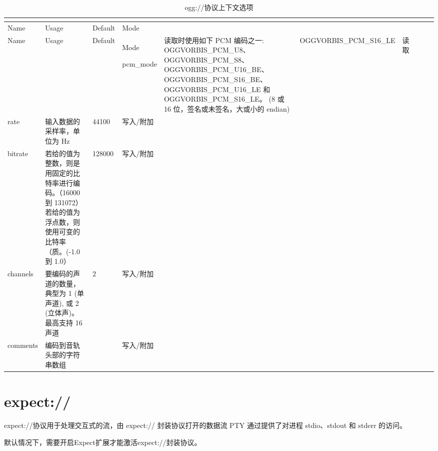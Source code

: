 \begin{longtable}{|m{40pt}|m{150pt}|m{60pt}|m{100pt}|}
\tabularnewline\hline
Name&Usage&Default&Mode
\endhead

\caption{ogg://协议上下文选项}\\
\hline
Name&Usage&Default&Mode
\endfirsthead

\endfoot

\endlastfoot
\hline
pcm\_mode&读取时使用如下 PCM 编码之一: OGGVORBIS\_PCM\_U8、OGGVORBIS\_PCM\_S8、 OGGVORBIS\_PCM\_U16\_BE、OGGVORBIS\_PCM\_S16\_BE、 OGGVORBIS\_PCM\_U16\_LE 和 OGGVORBIS\_PCM\_S16\_LE。 (8 或 16 位，签名或未签名，大或小的 endian)	&OGGVORBIS\_PCM\_S16\_LE	&读取\\
\hline
rate	&输入数据的采样率，单位为 Hz	&44100	&写入/附加\\
\hline
bitrate&若给的值为整数，则是用固定的比特率进行编码。（16000 到 131072）若给的值为浮点数，则使用可变的比特率（质。(-1.0 到 1.0）&128000	&写入/附加\\
\hline
channels&要编码的声道的数量，典型为 1 (单声道), 或 2 (立体声)。最高支持 16 声道&2&写入/附加\\
\hline
comments&编码到音轨头部的字符串数组&& 	写入/附加\\
\hline
\end{longtable}

\section{expect://}

expect://协议用于处理交互式的流，由 expect:// 封装协议打开的数据流 PTY 通过提供了对进程 stdio、stdout 和 stderr 的访问。

默认情况下，需要开启Expect扩展才能激活expect://封装协议。

